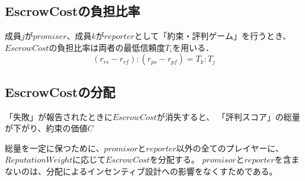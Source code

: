 \subsection{EscrowCostの負担比率}
成員$j$が$promiser$、成員$k$が$reporter$として「約束・評判ゲーム」を行うとき、
$ EscrowCost $の負担比率は両者の最低信頼度$T_i$を用いる．\\

\begin{equation}
  (r_{rs} - r_{rf}):(r_{ps} - r_{pf}) = T_k:T_j
\end{equation}

\subsection{EscrowCostの分配}
「失敗」が報告されたときに$EscrowCost$が消失すると、
「評判スコア」の総量が下がり、約束の価値$C$

総量を一定に保つために、$promisor$と$reporter$以外の全てのプレイヤーに、
$ReputationWeight$に応じて$EscrowCost$を分配する。
$promisor$と$reporter$を含まないのは、分配によるインセンティブ設計への影響をなくすためである。














